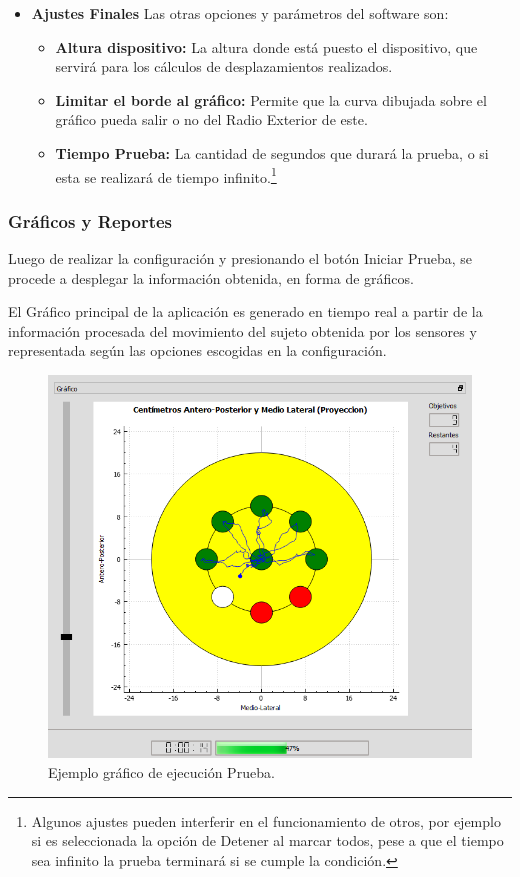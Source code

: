 \documentclass[12pt,a4paper]{article}
\begin{document}
\begin{itemize}
	\item \textbf{Ajustes Finales} Las otras opciones y parámetros del software son:
	\begin{itemize}
		\item \textbf{Altura dispositivo:} La altura donde está puesto el dispositivo, que servirá para los cálculos de desplazamientos realizados.
		\item \textbf{Limitar el borde al gráfico:} Permite que la curva dibujada sobre el gráfico pueda salir o no del Radio Exterior de este.
		\item \textbf{Tiempo Prueba:} La cantidad de segundos que durará la prueba, o si esta se realizará de tiempo infinito.\footnote{Algunos ajustes pueden interferir en el funcionamiento de otros, por ejemplo si es seleccionada la opción de Detener al marcar todos, pese a que el tiempo sea infinito la prueba terminará si se cumple la condición.}
	\end{itemize}
\end{itemize}


\newpage
\subsubsection{Gráficos y Reportes}
Luego de realizar la configuración y presionando el botón Iniciar Prueba, se procede a desplegar la información obtenida, en forma de gráficos.

El Gráfico principal de la aplicación es generado en tiempo real a partir de la información procesada del movimiento del sujeto obtenida por los sensores y representada según las opciones escogidas en la configuración.

\begin{figure}[H]
	\centering
	\includegraphics[scale=0.84]{images/graficosyreportes/graficoPrincipal}
	\caption{Ejemplo gráfico de ejecución Prueba.}
	\label{fig:graficoPrincipal}
\end{figure}
\end{document}
